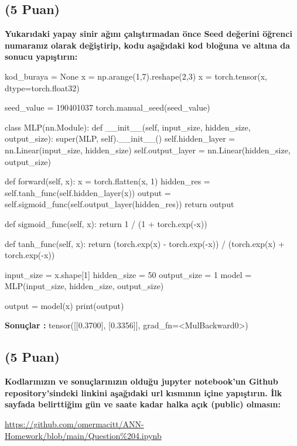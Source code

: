 \documentclass[11pt]{article}
\begin{document}
\subsection{(5 Puan)} \textbf{Yukarıdaki yapay sinir ağını çalıştırmadan önce Seed değerini öğrenci numaranız olarak değiştirip, kodu aşağıdaki kod bloğuna ve altına da sonucu yapıştırın:}

\begin{python}
kod_buraya = None
x = np.arange(1,7).reshape(2,3)
x = torch.tensor(x, dtype=torch.float32)

seed_value = 190401037
torch.manual_seed(seed_value)

class MLP(nn.Module):
    def __init__(self, input_size, hidden_size, output_size):
        super(MLP, self).__init__()
        self.hidden_layer = nn.Linear(input_size, hidden_size)
        self.output_layer = nn.Linear(hidden_size, output_size)

    def forward(self, x):
        x = torch.flatten(x, 1)
        hidden_res = self.tanh_func(self.hidden_layer(x))
        output = self.sigmoid_func(self.output_layer(hidden_res))
        return output
    
    def sigmoid_func(self, x):
        return 1 / (1 + torch.exp(-x))
    
    def tanh_func(self, x):
        return (torch.exp(x) - torch.exp(-x)) / (torch.exp(x) + torch.exp(-x))

input_size = x.shape[1]
hidden_size = 50
output_size = 1
model = MLP(input_size, hidden_size, output_size)

output = model(x)
print(output)

\end{python}

\textbf{Sonuçlar :} tensor([[0.3700],
        [0.3356]], grad_fn=<MulBackward0>)

\subsection{(5 Puan)} \textbf{Kodlarınızın ve sonuçlarınızın olduğu jupyter notebook'un Github repository'sindeki linkini aşağıdaki url kısmının içine yapıştırın. İlk sayfada belirttiğim gün ve saate kadar halka açık (public) olmasın:}

\url{https://github.com/omermacitt/ANN-Homework/blob/main/Question%204.ipynb}
\end{document}
